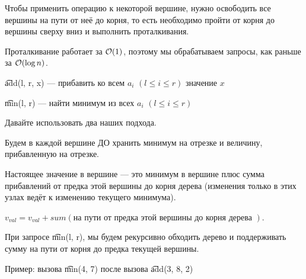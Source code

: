 Чтобы применить операцию к некоторой вершине, нужно освободить все вершины на пути от неё до корня, то есть необходимо пройти от корня до вершины сверху вниз и выполнить проталкивания.

Проталкивание работает за $\mathcal{O}(1)$, поэтому мы обрабатываем запросы, как раньше за $\mathcal{O}(\log n)$.


\begin{MyList}[0pt]
	\item \t{add(l, r, x)} --- прибавить ко всем $a_i$ $(l \le i \le r)$ значение $x$
	\item \t{min(l, r)} --- найти минимум из всех $a_i$ $(l \le i \le r)$
\end{MyList}
\up \up

Давайте использовать два наших подхода. 

Будем в каждой вершине ДО хранить минимум на отрезке и величину, прибавленную на отрезке.

Настоящее значение в вершине --- это минимум в вершине плюс сумма прибавлений от предка этой вершины до корня дерева (изменения только в этих узлах ведёт к изменению текущего минимума). 

$v_{val} = v_{val} + sum(\text{на пути от предка этой вершины до корня дерева })$.
\down


При запросе \t{min(l, r)}, мы будем рекурсивно обходить дерево и поддерживать сумму на пути от корня до предка текущей вершины. 

\pagebreak

Пример: вызова \t{min(4, 7)} после вызова \t{add(3, 8, 2)}

\up \up
\begin{center}
	\begin{figure}[h]
	\end{figure}
\end{center}

